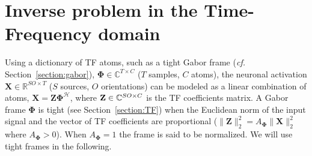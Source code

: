 \section{Inverse problem in the Time-Frequency domain} \label{irtfmxne}

Using a dictionary of TF atoms, such as a tight Gabor frame (\textit{cf.} Section~\ref{section:gabor}), $\mathbf{\Phi} \in \mathbb{C}^{T \times C}$ ($T$ samples, $C$ atoms), the neuronal activation $\mathbf{X} \in \mathbb{R}^{SO \times T}$ ($S$ sources, $O$ orientations) can be modeled as a linear combination of atoms, $\mathbf{X}=\mathbf{Z\Phi}^{\mathcal{H}}$, where $\mathbf{Z} \in \mathbb{C}^{SO \times C}$ is the TF coefficients matrix. A Gabor frame $\mathbf{\Phi}$ is tight (see Section~\ref{section:TF}) when the Euclidean norm of the input signal and the vector of TF coefficients are proportional ($\|\mathbf{Z}\|_2^2 = A_\mathbf{\Phi} \|\mathbf{X}\|_2^2$ where $A_\mathbf{\Phi}>0$). When $A_\mathbf{\Phi}=1$ the frame is said to be normalized. We will use tight frames in the following.

